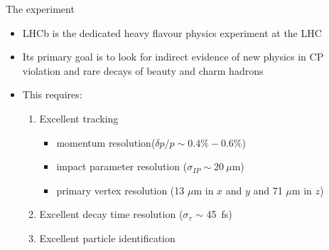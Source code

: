 \documentclass[aspectratio=1610]{beamer}
\begin{document}
\begin{frame}{The \lhcb experiment}
  \begin{itemize}
  \item LHCb is the dedicated heavy flavour physics experiment at the LHC
  \item Its primary goal is to look for indirect evidence of new physics in CP violation and rare decays of beauty and charm hadrons
  \item This requires:
    \begin{enumerate}
    \item Excellent tracking 
      \begin{itemize}
      \item momentum resolution($\delta p/p \sim 0.4\% - 0.6\%$)
      \item impact parameter resolution ($\sigma_{IP} \sim 20~\mu$m)
      \item primary vertex resolution (13 $\mu$m in $x$ and $y$ and 71 $\mu$m in $z$)
      \end{itemize}
    \item Excellent decay time resolution ($\sigma_{\tau}$ $\sim$ 45~fs)
    \item Excellent particle identification
    \end{enumerate}
  \end{itemize}

    \bigskip
    

\end{frame}
\end{document}
